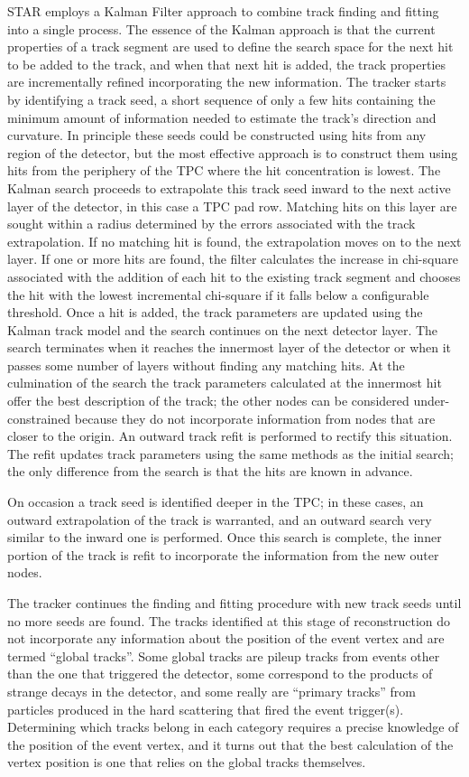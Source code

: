 STAR employs a Kalman Filter approach to combine track finding and fitting into a single process.  The essence of the Kalman approach is that the current properties of a track segment are used to define the search space for the next hit to be added to the track, and when that next hit is added, the track properties are incrementally refined incorporating the new information.  The tracker starts by identifying a track seed, a short sequence of only a few hits containing the minimum amount of information needed to estimate the track's direction and curvature.  In principle these seeds could be constructed using hits from any region of the detector, but the most effective approach is to construct them using hits from the periphery of the TPC where the hit concentration is lowest.  The Kalman search proceeds to extrapolate this track seed inward to the next active layer of the detector, in this case a TPC pad row.  Matching hits on this layer are sought within a radius determined by the errors associated with the track extrapolation.  If no matching hit is found, the extrapolation moves on to the next layer.  If one or more hits are found, the filter calculates the increase in chi-square associated with the addition of each hit to the existing track segment and chooses the hit with the lowest incremental chi-square if it falls below a configurable threshold.  Once a hit is added, the track parameters are updated using the Kalman track model and the search continues on the next detector layer.  The search terminates when it reaches the innermost layer of the detector or when it passes some number of layers without finding any matching hits.  At the culmination of the search the track parameters calculated at the innermost hit offer the best description of the track; the other nodes can be considered under-constrained because they do not incorporate information from nodes that are closer to the origin.  An outward track refit is performed to rectify this situation.  The refit updates track parameters using the same methods as the initial search; the only difference from the search is that the hits are known in advance.

On occasion a track seed is identified deeper in the TPC; in these cases, an outward extrapolation of the track is warranted, and an outward search very similar to the inward one is performed.  Once this search is complete, the inner portion of the track is refit to incorporate the information from the new outer nodes.

The tracker continues the finding and fitting procedure with new track seeds until no more seeds are found.  The tracks identified at this stage of reconstruction do not incorporate any information about the position of the event vertex and are termed ``global tracks''.  Some global tracks are pileup tracks from events other than the one that triggered the detector, some correspond to the products of strange decays in the detector, and some really are ``primary tracks'' from particles produced in the hard scattering that fired the event trigger(s).  Determining which tracks belong in each category requires a precise knowledge of the position of the event vertex, and it turns out that the best calculation of the vertex position is one that relies on the global tracks themselves.

